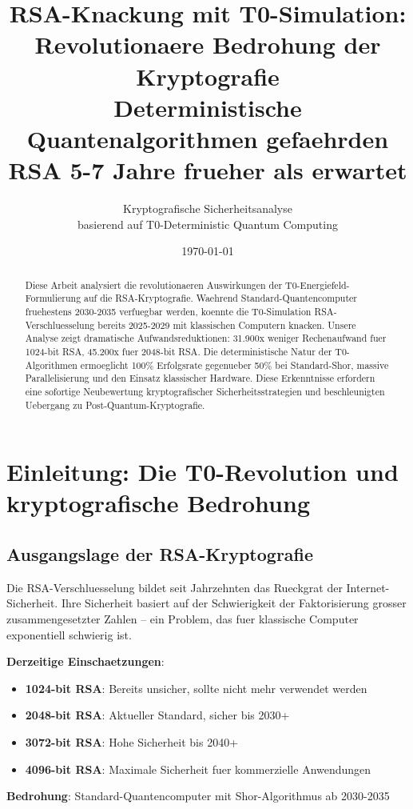 \documentclass[12pt,a4paper]{article}
\title{RSA-Knackung mit T0-Simulation: \\
	Revolutionaere Bedrohung der Kryptografie \\
	\large Deterministische Quantenalgorithmen gefaehrden RSA 5-7 Jahre frueher als erwartet}
\author{Kryptografische Sicherheitsanalyse \\
	basierend auf T0-Deterministic Quantum Computing}
\date{\today}
\begin{document}
	
	\maketitle
	
	\begin{abstract}
		Diese Arbeit analysiert die revolutionaeren Auswirkungen der T0-Energiefeld-Formulierung auf die RSA-Kryptografie. Waehrend Standard-Quantencomputer fruehestens 2030-2035 verfuegbar werden, koennte die T0-Simulation RSA-Verschluesselung bereits 2025-2029 mit klassischen Computern knacken. Unsere Analyse zeigt dramatische Aufwandsreduktionen: 31.900x weniger Rechenaufwand fuer 1024-bit RSA, 45.200x fuer 2048-bit RSA. Die deterministische Natur der T0-Algorithmen ermoeglicht 100\% Erfolgsrate gegenueber 50\% bei Standard-Shor, massive Parallelisierung und den Einsatz klassischer Hardware. Diese Erkenntnisse erfordern eine sofortige Neubewertung kryptografischer Sicherheitsstrategien und beschleunigten Uebergang zu Post-Quantum-Kryptografie.
	\end{abstract}
	
	\tableofcontents
	\newpage
	
	\section{Einleitung: Die T0-Revolution und kryptografische Bedrohung}
	
	\subsection{Ausgangslage der RSA-Kryptografie}
	
	Die RSA-Verschluesselung bildet seit Jahrzehnten das Rueckgrat der Internet-Sicherheit. Ihre Sicherheit basiert auf der Schwierigkeit der Faktorisierung grosser zusammengesetzter Zahlen -- ein Problem, das fuer klassische Computer exponentiell schwierig ist.
	
	\begin{tcolorbox}[colback=red!5!white,colframe=red!75!black,title=Aktuelle RSA-Sicherheitslage]
		\textbf{Derzeitige Einschaetzungen}:
		\begin{itemize}
			\item \textbf{1024-bit RSA}: Bereits unsicher, sollte nicht mehr verwendet werden
			\item \textbf{2048-bit RSA}: Aktueller Standard, sicher bis 2030+
			\item \textbf{3072-bit RSA}: Hohe Sicherheit bis 2040+
			\item \textbf{4096-bit RSA}: Maximale Sicherheit fuer kommerzielle Anwendungen
		\end{itemize}
		
		\textbf{Bedrohung}: Standard-Quantencomputer mit Shor-Algorithmus ab 2030-2035
	\end{tcolorbox}
	
\end{document}
